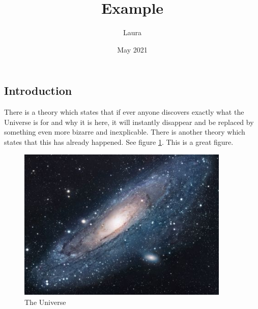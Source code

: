 \documentclass{article}
\title{Example}
\author{Laura }
\date{May 2021}
\begin{document}
\maketitle
\tableofcontents

\subsection{Introduction}\label{sec:intro}
There is a theory which states that if ever anyone discovers exactly what the Universe is for and why it is here, it will instantly disappear and be replaced by something even more bizarre and inexplicable.
There is another theory which states that this has already happened. See figure \ref{fig:universe}. This is a great figure.




\begin{figure}[h!]
\centering
\includegraphics[width=0.9\textwidth]{universe}
\caption{The Universe}
\label{fig:universe}
\end{figure}





\end{document}
